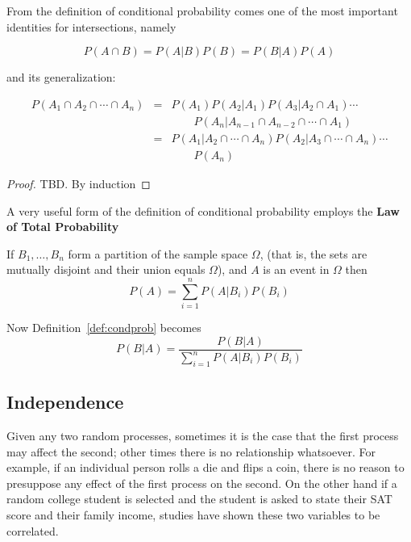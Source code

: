\documentclass[../main.tex]{subfiles}
\begin{document}
From the definition of conditional probability comes one of the most important
identities for intersections, namely
\begin{theorem}
	$$P(A \cap B) = P(A|B)P(B) = P(B|A)P(A)$$
\end{theorem}
\noindent
and its generalization:
\begin{theorem}
	\begin{eqnarray*}
	P(A_1 \cap A_2  \cap \cdots \cap A_n) &=&	P(A_1)P(A_2 | A_1)P(A_3 | A_2 \cap A_1) \cdots \\
	&& \qquad P(A_n | A_{n-1} \cap A_{n-2} \cap 
	\cdots \cap A_1) \\
	&=& P(A_1|A_2\cap\cdots \cap A_n)P(A_2|A_3\cap\cdots \cap A_n)\cdots \\
	&& \qquad P(A_n)
	\end{eqnarray*}
\end{theorem}

\begin{proof}
	TBD. By induction
\end{proof}
\noindent
A very useful form of the definition of conditional probability employs the \textbf{Law
of Total Probability}

\begin{theorem}
	If $B_1, \ldots, B_n$ form a partition of the sample space $\Omega$, (that is,
	the sets are mutually disjoint and their union equals $\Omega$), and $A$ is
	an event in $\Omega$ then
	\begin{equation}
	P(A) = \sum_{i=1}^n P(A|B_i)P(B_i)
	\end{equation}
\end{theorem}
\noindent
Now  Definition~\ref{def:condprob} becomes
\begin{equation}
P(B | A) = \dfrac{P(B | A)}{\sum_{i=1}^n P(A|B_i)P(B_i)}
\end{equation}

\subsection{Independence}
Given any two random processes, sometimes it is the case that the first process may affect the second; other times there is no relationship whatsoever. For example, if an individual person
rolls a die and flips a coin, there is no reason to presuppose
any effect of the first process on the second. On the other
hand if a random college student is selected and the student
is asked to state their SAT score and their family income, studies
have shown these two variables to be correlated.
\end{document}

